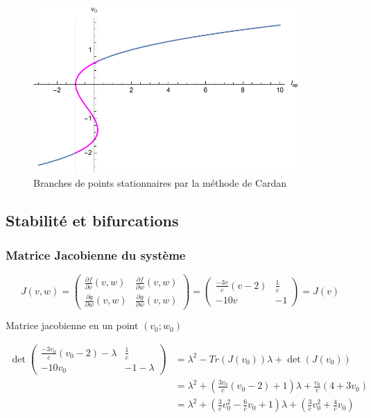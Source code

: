 \documentclass[12pt,a4paper,onecolumn]{article}
\begin{document}
\begin{figure}[ht]
\begin{center}
\includegraphics[origin =c, width = 0.9\textwidth]{Cardan}
\end{center}
\caption{Branches de points stationnaires par la méthode de Cardan}
\end{figure}



\subsection{Stabilité et bifurcations}
\subsubsection{Matrice Jacobienne du système}

\begin{equation*}
J(v,w)=
\begin{pmatrix}
\displaystyle{\frac{\partial f}{\partial v}(v,w)} & \displaystyle{\frac{\partial f}{\partial w}(v,w)} \\ \displaystyle{\frac{\partial g}{\partial w}(v,w)} & \displaystyle{\frac{\partial g}{\partial w}(v,w)}
\end{pmatrix}
=
\begin{pmatrix}
\displaystyle{\frac{-3v}{c}(v-2)} & \displaystyle{\frac{1}{c}} \\ -10v & -1
\end{pmatrix}
=J(v)
\end{equation*}


Matrice jacobienne en un point $(v_0 ; w_0)$

\begin{align*}
\det
\begin{pmatrix}
\displaystyle{\frac{-3v_0}{c}(v_0-2) -\lambda} & \displaystyle{\frac{1}{c}} \\ -10v_0 & -1 - \lambda
\end{pmatrix}
		&= \lambda^2 - Tr(J(v_0)) \lambda + \det(J(v_0)) \\
        &= \lambda^2 + \left(\frac{3v_0}{c}(v_0 - 2) + 1\right)\lambda + \frac{v_0}{c}(4 + 3 v_0)\\
        &= \lambda^2 + \left(\frac{3}{c}v_0^2-\frac{6}{c}v_0 + 1\right)\lambda + \left(\frac{3}{c}v_0^2 + \frac{4}{c}v_0\right)
\end{align*}
\end{document}

